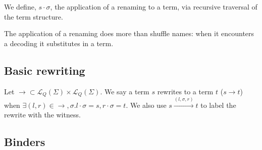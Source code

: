 \begin{definition}
  We define, $s \cdot \sigma$, the application of a renaming to a
  term, via recursive traversal of the term structure.

\end{definition}

\begin{remark}
  The application of a renaming does more than shuffle names: when it
  encounters a decoding it substitutes in a term. 
\end{remark}

\subsection{Basic rewriting}

\begin{definition}
  Let $\rightarrow \subset \mathcal{L}_{Q}(\Sigma) \times
  \mathcal{L}_{Q}(\Sigma)$. We say a term $s$ rewrites to a term $t$
  ($s \rightarrow t$) when $\exists (l,r) \in \rightarrow,
  \sigma. l \cdot \sigma = s, r \cdot \sigma = t$. We also use $s
  \stackrel{(l,\sigma,r)}{\rightarrow} t$ to label the rewrite with
  the witness.
\end{definition}

\subsection{Binders}

